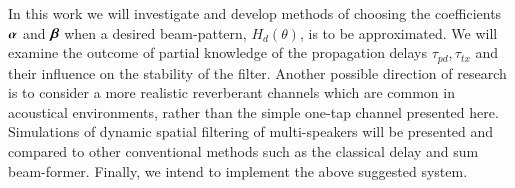 In this work we will investigate and develop methods of choosing the coefficients $ \boldsymbol{\alpha} $ and $ \boldsymbol{\beta} $ when a desired beam-pattern, $ H_{d}(\theta)$, is to be approximated. We will examine the outcome of partial knowledge of the propagation delays $\tau_{pd},\tau_{tx}$ and their influence on the stability of the filter. Another possible direction of research is to consider a more realistic reverberant channels which are common in acoustical environments, rather than the simple one-tap channel presented here. Simulations of dynamic spatial filtering of multi-speakers will be presented and compared to other conventional methods such as the classical delay and sum beam-former. Finally, we intend to implement the above suggested system.